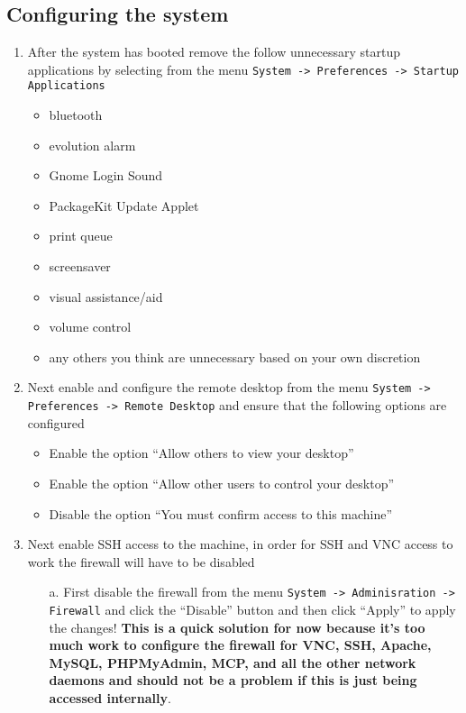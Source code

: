 \subsection{Configuring the system}
\label{sec:rhconfig}
\begin{enumerate}
\item 	After the system has booted remove the follow unnecessary startup applications by selecting from the menu  
		\verb|System -> Preferences -> Startup Applications|
\begin{itemize}
\item	bluetooth
\item	evolution alarm
\item	Gnome Login Sound
\item	PackageKit Update Applet
\item	print queue
\item	screensaver
\item	visual assistance/aid
\item	volume control
\item	any others you think are unnecessary based on your own discretion
\end{itemize}

\item	Next enable and configure the remote desktop from the menu \verb|System -> Preferences -> Remote Desktop| and ensure
		that the following options are configured	
\begin{itemize}
\item	Enable the option ``Allow others to view your desktop''
\item	Enable the option ``Allow other users to control your desktop''
\item	Disable the option ``You must confirm access to this machine''
\end{itemize}

\item	Next enable SSH access to the machine, in order for SSH and VNC access to work the firewall will have to be disabled
\begin{itemize}
\item[a.]	First disable the firewall from the menu \verb|System -> Adminisration -> Firewall| and click the ``Disable'' 
			button and then click ``Apply'' to apply the changes! {\bf This is a quick solution for now because it's too 
			much work to configure the firewall for VNC, SSH, Apache, MySQL, PHPMyAdmin, MCP, and all the other network 
			daemons and should not be a problem if this is just being accessed internally}.


\end{itemize}
\end{enumerate}
